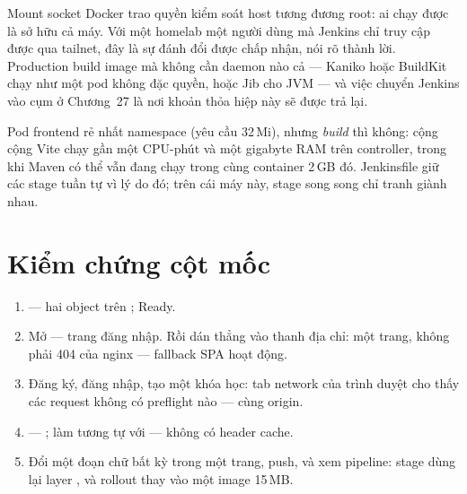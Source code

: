 \begin{decision}
Mount socket Docker trao quyền kiểm soát host tương đương root: ai
chạy được  là sở hữu cả máy. Với một
homelab một người dùng mà Jenkins chỉ truy cập được qua tailnet, đây
là sự đánh đổi được chấp nhận, nói rõ thành lời. Production build
image mà không cần daemon nào cả --- Kaniko hoặc BuildKit chạy như
một pod không đặc quyền, hoặc Jib cho JVM --- và việc chuyển Jenkins
vào cụm ở Chương~27 là nơi khoản thỏa hiệp này sẽ được trả lại.
\end{decision}

\begin{hardware}
Pod frontend rẻ nhất namespace (yêu cầu 32\,Mi), nhưng \emph{build}
thì không:  cộng  cộng Vite chạy gần một
CPU-phút và một gigabyte RAM trên controller, trong khi Maven có thể
vẫn đang chạy trong cùng container 2\,GB đó. Jenkinsfile giữ các stage
tuần tự vì lý do đó; trên cái máy này, stage song song chỉ tranh giành
nhau.
\end{hardware}

\section{Kiểm chứng cột mốc}

\begin{handson}
\begin{enumerate}
  \item {} --- hai object trên
  ;  Ready.
  \item Mở  --- trang đăng nhập. Rồi dán thẳng
   vào thanh địa chỉ: một trang, không
  phải 404 của nginx --- fallback SPA hoạt động.
  \item Đăng ký, đăng nhập, tạo một khóa học: tab network của trình
  duyệt cho thấy các request  không có preflight
   nào --- cùng origin.
  \item {} --- ; làm tương tự với \code{/} ---
  không có header cache.
  \item Đổi một đoạn chữ bất kỳ trong một trang, push, và xem pipeline:
  stage  dùng lại layer , và rollout
  thay vào một image 15\,MB.
\end{enumerate}
\end{handson}

